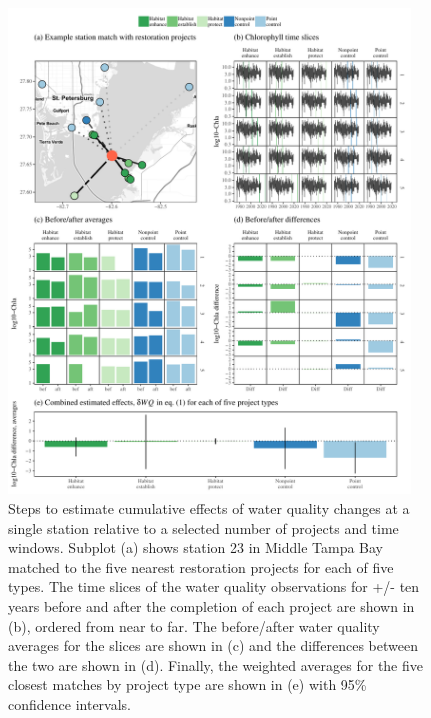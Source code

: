 \documentclass[]{article}
\begin{document}
\begin{figure}
\centerline{\includegraphics[width = 0.95\textwidth]{figs/statex.pdf}}
\caption{Steps to estimate cumulative effects of water quality changes at a single station relative to a selected number of projects and time windows. Subplot (a) shows station 23 in Middle Tampa Bay matched to the five nearest restoration projects for each of five types.  The time slices of the water quality observations for +/- ten years before and after the completion of each project are shown in (b), ordered from near to far.  The before/after water quality averages for the slices are shown in (c) and the differences between the two are shown in (d).  Finally, the weighted averages for the five closest matches by project type are shown in (e) with 95\% confidence intervals. }
\label{fig:statex}
\end{figure}
\end{document}
